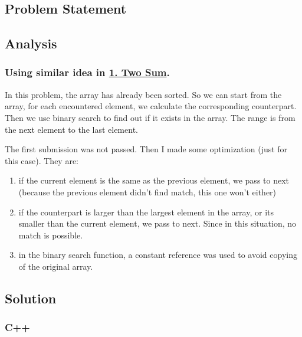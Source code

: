 \documentclass[12pt]{article}
\begin{document}
\subsection{Problem Statement}
\label{sec:org4c45ad7}
\subsection{Analysis}
\label{sec:orgf5cf799}
\subsubsection{Using similar idea in \hyperref[org715fb1a]{1. Two Sum}.}
\label{sec:org8e707d5}
In this problem, the array has already been sorted. So we can start from the array, for each encountered element, we calculate the corresponding counterpart. Then we use binary search to find out if it exists in the array. The range is from the next element to the last element.

The first submission was not passed. Then I made some optimization (just for this case). They are:
\begin{enumerate}
\item if the current element is the same as the previous element, we pass to next (because the previous element didn't find match, this one won't either)
\item if the counterpart is larger than the largest element in the array, or its smaller than the current element, we pass to next. Since in this situation, no match is possible.
\item in the binary search function, a constant reference was used to avoid copying of the original array.
\end{enumerate}
\subsection{Solution}
\label{sec:org6ed4bb2}
\subsubsection{C++}
\label{sec:org9cea495}
\end{document}
